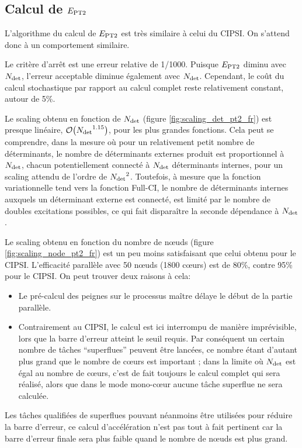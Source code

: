 \documentclass[./thesis.tex]{subfiles}
\begin{document}
\subsection{Calcul de $E_\text{PT2}$}

L’algorithme du calcul de $E_\text{PT2}$ est très similaire à celui du CIPSI. On s'attend donc à un comportement similaire.

Le critère d'arrêt est une erreur relative de 1/1000. Puisque $E_\text{PT2}$ diminu avec ${N_\text{det}}$, l'erreur acceptable diminue également avec ${N_\text{det}}$. Cependant, le coût du calcul stochastique par rapport au calcul complet reste relativement constant, autour de 5\%.

Le scaling obtenu en fonction de ${N_\text{det}}$ (figure \ref{fig:scaling_det_pt2_fr}) est presque linéaire, $\order{\Ndet^{1.15}}$, pour les plus grandes fonctions. Cela peut se comprendre, dans la mesure où pour un relativement petit nombre de déterminants, le nombre de déterminants externes produit est proportionnel à ${N_\text{det}}$, chacun potentiellement connecté à ${N_\text{det}}$ déterminants internes, pour un scaling attendu de l'ordre de ${N_\text{det}}^2$. Toutefois, à mesure que la fonction variationnelle tend vers la fonction Full-CI, le nombre de déterminants internes auxquels un déterminant externe est connecté, est limité par le nombre de doubles excitations possibles, ce qui fait disparaître la seconde dépendance à ${N_\text{det}}$.

Le scaling obtenu en fonction du nombre de nœuds (figure \ref{fig:scaling_node_pt2_fr}) est un peu moins satisfaisant que celui obtenu pour le CIPSI. L'efficacité parallèle avec 50 nœuds (1800 cœurs) est de 80\%, contre 95\% pour le CIPSI. On peut trouver deux raisons à cela:
\begin{itemize}
\item
Le pré-calcul des peignes sur le processus maître délaye le début de la partie parallèle.
\item
Contrairement au CIPSI, le calcul est ici interrompu de manière imprévisible, lors que la barre d'erreur atteint le seuil requis. Par conséquent un certain nombre de tâches ``superflues'' peuvent être lancées, ce nombre étant d'autant plus grand que le nombre de cœurs est important ; dans la limite où ${N_\text{det}}$ est égal au nombre de cœurs, c'est de fait toujours le calcul complet qui sera réalisé, alors que dans le mode mono-cœur aucune tâche superflue ne sera calculée.
\end{itemize}

Les tâches qualifiées de superflues pouvant néanmoins être utilisées pour réduire la barre d'erreur, ce calcul d'accélération n'est pas tout à fait pertinent car la barre d'erreur finale sera plus faible quand le nombre de nœuds est plus grand.
\end{document}
